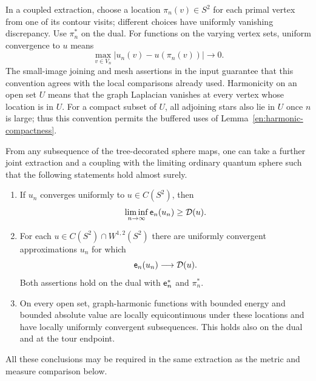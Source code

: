 In a coupled extraction, choose a location $\pi_n(v)\in S^2$ for each
primal vertex from one of its contour visits; different choices have
uniformly vanishing discrepancy.  Use $\pi_n^*$ on the dual.
For functions on the varying vertex sets, uniform convergence to $u$
means
\[
 \max_{v\in V_n}|u_n(v)-u(\pi_n(v))|\longrightarrow0.
\]
The small-image joining and mesh assertions in the input guarantee that
this convention agrees with the local comparisons already used.
Harmonicity on an open set $U$ means that the graph Laplacian vanishes
at every vertex whose location is in $U$.  For a compact subset of
$U$, all adjoining stars also lie in $U$ once $n$ is large; thus
this convention permits the buffered uses of
Lemma~\ref{en:harmonic-compactness}.

\begin{theorem}\label{sph:energy}
From any subsequence of the tree-decorated sphere maps, one can take a
further joint extraction and a coupling with the limiting ordinary
quantum sphere such that the following statements hold almost surely.
\begin{enumerate}
\item If $u_n$ converges uniformly to $u\in C(S^2)$, then
\[
 \liminf_{n\to\infty}\mathsf e_n(u_n)\ge\mathcal D(u).
\]
\item For each $u\in C(S^2)\cap W^{1,2}(S^2)$ there are uniformly
convergent approximations $u_n$ for which
\[
 \mathsf e_n(u_n)\longrightarrow\mathcal D(u).
\]
Both assertions hold on the dual with $\mathsf e_n^*$ and $\pi_n^*$.
\item On every open set, graph-harmonic functions with bounded energy
and bounded absolute value are locally equicontinuous under these
locations and have locally uniformly convergent subsequences.  This
holds also on the dual and at the tour endpoint.
\end{enumerate}
All these conclusions may be required in the same extraction as the
metric and measure comparison below.
\end{theorem}

